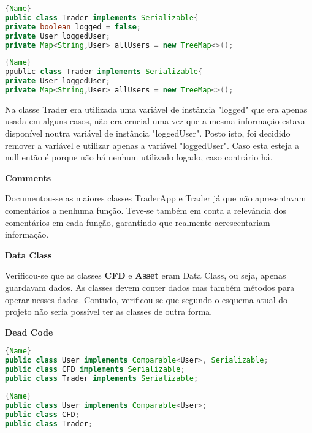 \noindent\begin{minipage}{.45\textwidth}
\begin{lstlisting}[breaklines,caption=Original,frame=tlrb,language=java]{Name}
public class Trader implements Serializable{
private boolean logged = false;
private User loggedUser;
private Map<String,User> allUsers = new TreeMap<>();
\end{lstlisting}
\end{minipage}\hfill
\begin{minipage}{.45\textwidth}
\begin{lstlisting}[breaklines,caption=Refactored,frame=tlrb,language=java]{Name}
ppublic class Trader implements Serializable{
private User loggedUser;
private Map<String,User> allUsers = new TreeMap<>();
\end{lstlisting}
\end{minipage}

Na classe Trader era utilizada uma variável de instância "logged" que era apenas usada em alguns casos, não era crucial uma vez que a mesma informação estava disponível noutra variável de instância "loggedUser". Posto isto, foi decidido remover a variável e utilizar apenas a variável "loggedUser". Caso esta esteja a null então é porque não há nenhum utilizado logado, caso contrário há.

\vspace{5mm}
\textbf{Comments}

Documentou-se as maiores classes TraderApp e Trader já que não apresentavam comentários a nenhuma função. Teve-se também em conta a relevância dos comentários em cada função, garantindo que realmente acrescentariam informação.

\vspace{5mm}
\textbf{Data Class}

Verificou-se que as classes \textbf{CFD} e \textbf{Asset} eram Data Class, ou seja, apenas guardavam dados. As classes devem conter dados mas também métodos para operar nesses dados. Contudo, verificou-se que segundo o esquema atual do projeto não seria possível ter as classes de outra forma.

\newpage
\textbf{Dead Code}

\noindent\begin{minipage}{.45\textwidth}
\begin{lstlisting}[breaklines,caption=Original,frame=tlrb,language=java]{Name}
public class User implements Comparable<User>, Serializable;
public class CFD implements Serializable;
public class Trader implements Serializable;

\end{lstlisting}
\end{minipage}\hfill
\begin{minipage}{.45\textwidth}
\begin{lstlisting}[breaklines,caption=Refactored,frame=tlrb,language=java]{Name}
public class User implements Comparable<User>;
public class CFD;
public class Trader;
\end{lstlisting}
\end{minipage}

